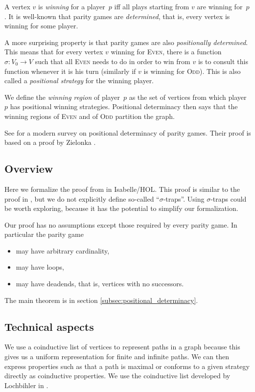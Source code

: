\documentclass[11pt,a4paper]{scrartcl}
\newcommand{\Even}{\textsc{Even}\xspace}
\newcommand{\Odd}{\textsc{Odd}\xspace}
\begin{document}
A vertex $v$ is \emph{winning} for a player~$p$ iff all plays starting
from $v$ are winning for~$p$.  It is well-known that parity games are
\emph{determined}, that is, every vertex is winning for some player.

A more surprising property is that parity games are also
\emph{positionally determined}.  This means that for every vertex $v$
winning for \Even, there is a function $\sigma: V_0 \to V$ such that
all \Even needs to do in order to win from $v$ is to consult this
function whenever it is his turn (similarly if $v$ is winning for
\Odd).  This is also called a \emph{positional strategy} for the
winning player.

We define the \emph{winning region} of player~$p$ as the set of
vertices from which player~$p$ has positional winning strategies.
Positional determinacy then says that the winning regions of \Even and
of \Odd partition the graph.

See \cite{automata2002/kuesters} for a modern survey on positional
determinacy of parity games.  Their proof is based on a proof by
Zielonka \cite{zielonka1998}.

\subsection{Overview}

Here we formalize the proof from \cite{kreutzer2015} in Isabelle/HOL.
This proof is similar to the proof in \cite{automata2002/kuesters},
but we do not explicitly define so-called ``$\sigma$-traps''.  Using
$\sigma$-traps could be worth exploring, because it has the potential
to simplify our formalization.

Our proof has no assumptions except those required by every parity
game.  In particular the parity game
\begin{itemize}
\item may have arbitrary cardinality,
\item may have loops,
\item may have deadends, that is, vertices with no successors.
\end{itemize}

The main theorem is in section \ref{subsec:positional_determinacy}.

\subsection{Technical aspects}

We use a coinductive list of vertices to represent paths in a graph
because this gives us a uniform representation for finite and infinite
paths.  We can then express properties such as that a path is maximal
or conforms to a given strategy directly as coinductive properties.
We use the coinductive list developed by Lochbihler in
\cite{Coinductive-AFP}.
\end{document}
